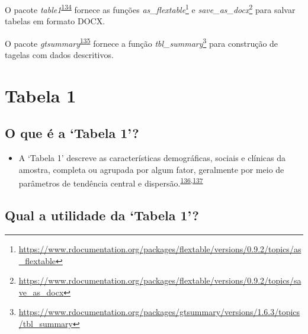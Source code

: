 \documentclass[
  a4paper,
]{book}
\providecommand{\tightlist}{%
  \setlength{\itemsep}{0pt}\setlength{\parskip}{0pt}}
\renewcommand{\href}[2]{#2\footnote{\url{#1}}}
\newenvironment{infobox}[1]
  {
  \begin{itemize}
  \renewcommand{\labelitemi}{
    \raisebox{-.7\height}[0pt][0pt]{
      {\setkeys{Gin}{width=3em,keepaspectratio}
        \texttt{[image: \#1]}}
    }
  }
  \setlength{\fboxsep}{1em}
  \begin{blackbox}
  \item
  }
  {
  \end{blackbox}
  \end{itemize}
  }
\begin{document}
\begin{infobox}{images/Rlogo}
O pacote \emph{table1}\textsuperscript{\protect\hyperlink{ref-flextable}{134}} fornece as funções \href{https://www.rdocumentation.org/packages/flextable/versions/0.9.2/topics/as_flextable}{\emph{as\_flextable}} e \href{https://www.rdocumentation.org/packages/flextable/versions/0.9.2/topics/save_as_docx}{\emph{save\_as\_docx}} para salvar tabelas em formato DOCX.

\end{infobox}

\begin{infobox}{images/Rlogo}
O pacote \emph{gtsummary}\textsuperscript{\protect\hyperlink{ref-gtsummary-2}{135}} fornece a função \href{https://www.rdocumentation.org/packages/gtsummary/versions/1.6.3/topics/tbl_summary}{\emph{tbl\_summary}} para construção de tagelas com dados descritivos.

\end{infobox}

\hypertarget{tabela-1}{%
\section{Tabela 1}\label{tabela-1}}

\hypertarget{o-que-uxe9-a-tabela-1}{%
\subsection{O que é a `Tabela 1'?}\label{o-que-uxe9-a-tabela-1}}

\begin{itemize}
\tightlist
\item
  A `Tabela 1' descreve as características demográficas, sociais e clínicas da amostra, completa ou agrupada por algum fator, geralmente por meio de parâmetros de tendência central e dispersão.\textsuperscript{\protect\hyperlink{ref-Westreich2013}{136},\protect\hyperlink{ref-chen2020}{137}}
\end{itemize}

\hypertarget{qual-a-utilidade-da-tabela-1}{%
\subsection{Qual a utilidade da `Tabela 1'?}\label{qual-a-utilidade-da-tabela-1}}
\end{document}
